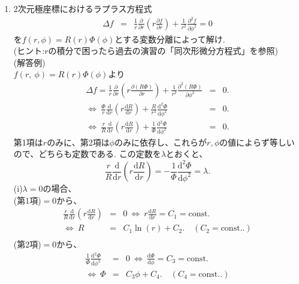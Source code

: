 \documentclass[11pt]{jsarticle}
\begin{document}
\begin{enumerate}
\newpage
\item 2次元極座標におけるラプラス方程式
\begin{eqnarray*}
 \Delta f &=&  \frac{1}{r} \frac{\partial }{\partial r} \left(r \frac{\partial f}{\partial r}\right)+ \frac{1}{r^2}\frac{\partial^2 f}{\partial \phi^2}=0 
\end{eqnarray*}
を$f(r,\phi)=R(r)\Phi(\phi)$とする変数分離によって解け.\\
(ヒント:$r$の積分で困ったら過去の演習の「同次形微分方程式」を参照)\\
(解答例)\\[8pt]
$f(r,\ \phi)= R(r) \Phi(\phi)$より
\begin{eqnarray*}
\Delta f =
\frac{1}{r} \frac{\partial }{\partial r}
\left(r \frac{\partial (R\Phi)}{\partial r}\right)+
\frac{1}{r^2}\frac{\partial^2 (R\Phi)}{\partial \phi^2} &=& 0.\\
\Leftrightarrow \ \frac{\Phi}{r} \frac{\mathrm{d}}{\mathrm{d}r}
\left(r \frac{\mathrm{d} R}{\mathrm{d} r}\right)+
\frac{R}{r^2}\frac{\mathrm{d}^2 \Phi}{\mathrm{d} \phi^2} &=& 0.\\
\Leftrightarrow \ \frac{r}{R} \frac{\mathrm{d} }{\mathrm{d} r}
\left(r \frac{\mathrm{d} R}{\mathrm{d} r}\right)+
\frac{1}{\Phi}\frac{\mathrm{d}^2 \Phi}{\mathrm{d} \phi^2} &=& 0.
\end{eqnarray*}
第1項は$r$のみに、第2項は$\phi$のみに依存し、これらが$r,\phi$の値によらず等しいので、どちらも定数である.
この定数を$\lambda$とおくと、
\[
\frac rR\frac {\mathrm{d}}{\mathrm{d}r}
\left(r\frac{\mathrm{d}R}{\mathrm{d}r}\right)=
-\frac1\Phi\frac{\mathrm{d}^2\Phi}{\mathrm{d}\phi^2}=\lambda.
\]
(i)$\lambda=0$の場合、\\
(第1項)$=0$から、
\begin{eqnarray*}
\frac{r}{R} \frac{\mathrm{d} }{\mathrm{d} r}
\left(r \frac{\mathrm{d} R}{\mathrm{d} r}\right) &=& 0
\  \Leftrightarrow \  r \frac{\mathrm{d} R}{\mathrm{d} r} =
C_1=\mathrm{const.}  \\[5pt]
\Leftrightarrow \ R &=& C_1\ln{(r)} + C_2. \quad ( C_2=\mathrm{const.}. ) \\
\end{eqnarray*}
%
(第2項)$=0$から、
\begin{eqnarray*}
\frac{1}{\Phi}\frac{\mathrm{d}^2 \Phi}{\mathrm{d} \phi^2} &=& 0
\  \Leftrightarrow \   \frac{\mathrm{d} \Phi}{\mathrm{d} \phi} =
C_3=\mathrm{const.}  \\[5pt]
\Leftrightarrow \ \Phi &=& C_3 \phi + C_4.\quad ( C_4=\mathrm{const.}. ) \\

\end{eqnarray*}
\end{enumerate}
\end{document}
